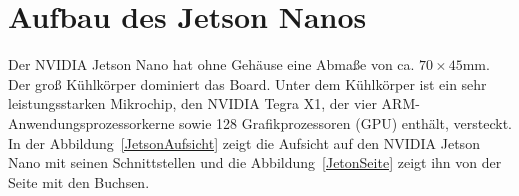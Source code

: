 \section{Aufbau des Jetson Nanos}


Der NVIDIA Jetson Nano hat ohne Gehäuse eine Abmaße von ca. $70 \times 45$mm. Der groß Kühlkörper dominiert das Board. 
Unter dem Kühlkörper ist ein sehr leistungsstarken Mikrochip, den NVIDIA Tegra X1, der vier ARM-Anwendungsprozessorkerne sowie 128 Grafikprozessoren (GPU) enthält, versteckt. In der Abbildung~\ref{JetsonAufsicht} zeigt die Aufsicht auf den NVIDIA Jetson Nano  mit seinen Schnittstellen und die Abbildung~\ref{JetonSeite} zeigt ihn von der Seite mit den Buchsen.




	


